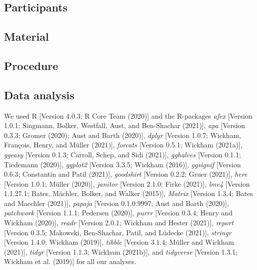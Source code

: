 \documentclass[
  english,
  man]{apa6}
\begin{document}
\hypertarget{participants}{%
\subsection{Participants}\label{participants}}

\hypertarget{material}{%
\subsection{Material}\label{material}}

\hypertarget{procedure}{%
\subsection{Procedure}\label{procedure}}

\hypertarget{data-analysis}{%
\subsection{Data analysis}\label{data-analysis}}

We used R {[}Version 4.0.3; R Core Team (2020){]} and the R-packages \emph{afex} {[}Version 1.0.1; Singmann, Bolker, Westfall, Aust, and Ben-Shachar (2021){]}, \emph{apa} {[}Version 0.3.3; Gromer (2020); Aust and Barth (2020){]}, \emph{dplyr} {[}Version 1.0.7; Wickham, François, Henry, and Müller (2021){]}, \emph{forcats} {[}Version 0.5.1; Wickham (2021a){]}, \emph{ggeasy} {[}Version 0.1.3; Carroll, Schep, and Sidi (2021){]}, \emph{gghalves} {[}Version 0.1.1; Tiedemann (2020){]}, \emph{ggplot2} {[}Version 3.3.5; Wickham (2016){]}, \emph{ggsignif} {[}Version 0.6.3; Constantin and Patil (2021){]}, \emph{goodshirt} {[}Version 0.2.2; Gruer (2021){]}, \emph{here} {[}Version 1.0.1; Müller (2020){]}, \emph{janitor} {[}Version 2.1.0; Firke (2021){]}, \emph{lme4} {[}Version 1.1.27.1; Bates, Mächler, Bolker, and Walker (2015){]}, \emph{Matrix} {[}Version 1.3.4; Bates and Maechler (2021){]}, \emph{papaja} {[}Version 0.1.0.9997; Aust and Barth (2020){]}, \emph{patchwork} {[}Version 1.1.1; Pedersen (2020){]}, \emph{purrr} {[}Version 0.3.4; Henry and Wickham (2020){]}, \emph{readr} {[}Version 2.0.1; Wickham and Hester (2021){]}, \emph{report} {[}Version 0.3.5; Makowski, Ben-Shachar, Patil, and Lüdecke (2021){]}, \emph{stringr} {[}Version 1.4.0; Wickham (2019){]}, \emph{tibble} {[}Version 3.1.4; Müller and Wickham (2021){]}, \emph{tidyr} {[}Version 1.1.3; Wickham (2021b){]}, and \emph{tidyverse} {[}Version 1.3.1; Wickham et al. (2019){]} for all our analyses.
\end{document}
